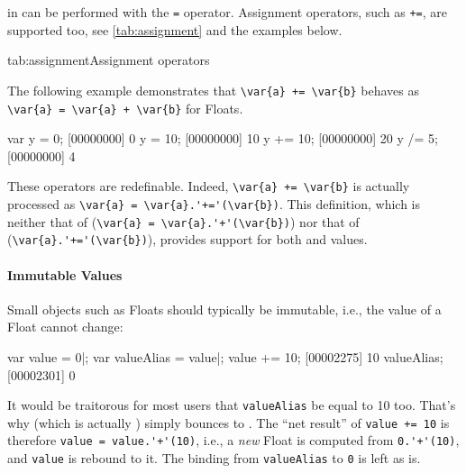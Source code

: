 in \us can be performed with the \lstinline|=| operator.
Assignment operators, such as \lstinline|+=|, are supported too, see
\autoref{tab:assignment} and the examples below.


\begin{operatorTable}{tab:assignment}{Assignment operators}
  \operatorass[\footnotemark]\\
  \operatorsiass
\end{operatorTable}


The following example demonstrates that \lstinline|\var{a} += \var{b}|
behaves as \lstinline|\var{a} = \var{a} + \var{b}| for Floats.
\begin{urbiscript}
var y = 0;
[00000000] 0
y = 10;
[00000000] 10
y += 10;
[00000000] 20
y /= 5;
[00000000] 4
\end{urbiscript}

These operators are redefinable.  Indeed, \lstinline|\var{a} += \var{b}| is
actually processed as \lstinline|\var{a} = \var{a}.'+='(\var{b})|.  This
definition, which is neither that of \langC
(\lstinline|\var{a} = \var{a}.'+'(\var{b})|) nor that of \Cxx
(\lstinline|\var{a}.'+='(\var{b})|), provides support for both
 and  values.

\paragraph{Immutable Values}
Small objects such as Floats should typically be immutable, i.e., the value
of a Float cannot change:

\begin{urbiscript}
var value = 0|;
var valueAlias = value|;
value += 10;
[00002275] 10
valueAlias;
[00002301] 0
\end{urbiscript}

It would be traitorous for most users that \lstinline{valueAlias} be equal
to 10 too.  That's why  (which is actually
) simply bounces to .  The ``net
result'' of \lstinline|value += 10| is therefore
\lstinline|value = value.'+'(10)|, i.e., a \emph{new} Float is computed from
\lstinline|0.'+'(10)|, and \lstinline{value} is rebound to it.  The binding
from \lstinline{valueAlias} to \lstinline|0| is left as is.

